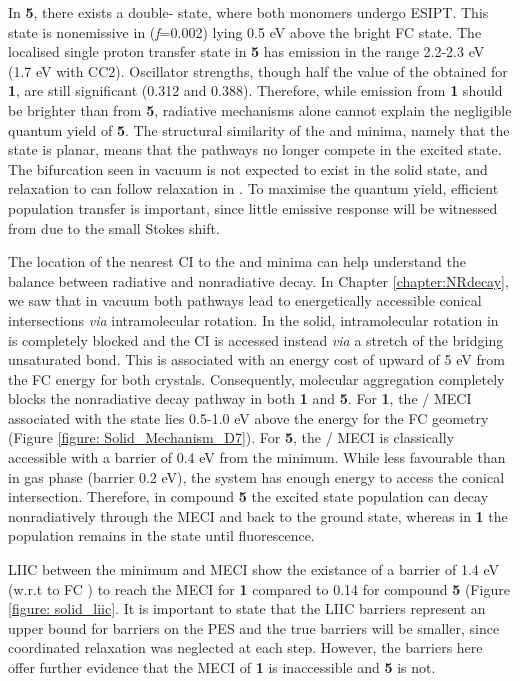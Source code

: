 In \textbf{5}, there  exists a double-\Kstar{} state, where both monomers undergo ESIPT. This state is nonemissive in \sone{} (\textit{f}=0.002) lying 0.5 eV above the bright FC state. The localised single proton transfer state in \textbf{5} has emission in the range 2.2-2.3 eV (1.7 eV with CC2). Oscillator strengths, though half the value of the obtained for \textbf{1}, are still significant (0.312 and 0.388). Therefore, while emission from \textbf{1} should be brighter than from \textbf{5}, radiative mechanisms alone cannot explain the negligible quantum yield of \textbf{5}. The structural similarity of the \Estar{} and \Kstar{} minima, namely that the \Estar{} state is planar, means that the pathways no longer compete in the excited state. The bifurcation seen in vacuum is not expected to exist in the solid state, and relaxation to \Kstar{} can follow relaxation in \Estar{}. To maximise the quantum yield, efficient population transfer \Kstar{} is important, since little emissive response will be witnessed from \Estar{} due to the small Stokes shift.

The location of the nearest CI to the \Estar{} and \Kstar{} minima can help understand the balance between radiative and nonradiative decay. In Chapter \ref{chapter:NRdecay}, we saw that in vacuum both pathways lead to energetically accessible conical intersections \textit{via} intramolecular rotation. In the solid, intramolecular rotation in \Estar{} is completely blocked and the \Estar{} CI is accessed instead \textit{via} a stretch of the bridging unsaturated bond. This is associated with an energy cost of upward of 5 eV from the FC \sone{} energy for both crystals. Consequently, molecular aggregation completely blocks the \Estar{} nonradiative decay pathway in both \textbf{1} and \textbf{5}. For \textbf{1}, the \sone/\szero{} MECI associated with the \Kstar{} state lies 0.5-1.0 eV above the \sone{} energy for the FC geometry (Figure \ref{figure: Solid_Mechanism_D7}). For \textbf{5}, the \sone/\szero{} MECI is classically accessible with a barrier of 0.4 eV from the \Kstar{} minimum. While less favourable than in gas phase (barrier 0.2 eV), the system has enough energy to access the conical intersection. Therefore, in compound \textbf{5} the excited state population can decay nonradiatively through the MECI and back to the ground state, whereas in \textbf{1} the population remains in the \Kstar{} state until fluorescence.

\ac{LIIC} between the \Kstar{} minimum and MECI  show the existance of a barrier of 1.4 eV (w.r.t to FC \sone{}) to reach the MECI for \textbf{1} compared to 0.14 for compound \textbf{5} (Figure \ref{figure: solid_liic}. It is important to state that the LIIC barriers represent an upper bound for barriers on the PES and the true barriers will be smaller, since coordinated relaxation was neglected at each step. However, the barriers here offer further evidence that the MECI of \textbf{1} is inaccessible and \textbf{5} is not. 


